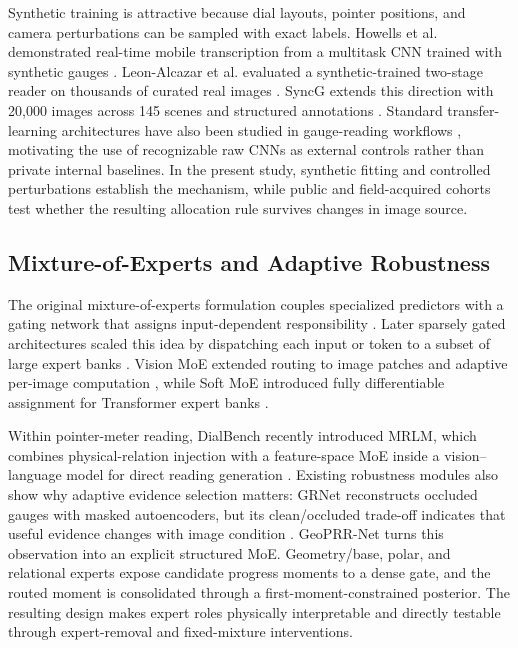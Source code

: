 \documentclass[electronics,article,submit,oneauthor]{Definitions/mdpi}
\newcommand{\modelname}{GeoPRR-Net\xspace}
\begin{document}
Synthetic training is attractive because dial layouts, pointer positions, and camera perturbations can be sampled with exact labels. Howells et al. demonstrated real-time mobile transcription from a multitask CNN trained with synthetic gauges \cite{howells2021analogue}. Leon-Alcazar et al. evaluated a synthetic-trained two-stage reader on thousands of curated real images \cite{leonalcazar2024synthetic}. SyncG extends this direction with 20,000 images across 145 scenes and structured annotations \cite{deng2026syncg}. Standard transfer-learning architectures have also been studied in gauge-reading workflows \cite{ninama2024transfer}, motivating the use of recognizable raw CNNs as external controls rather than private internal baselines. In the present study, synthetic fitting and controlled perturbations establish the mechanism, while public and field-acquired cohorts test whether the resulting allocation rule survives changes in image source.

\subsection{Mixture-of-Experts and Adaptive Robustness}

The original mixture-of-experts formulation couples specialized predictors with a gating network that assigns input-dependent responsibility \cite{jacobs1991adaptive}. Later sparsely gated architectures scaled this idea by dispatching each input or token to a subset of large expert banks \cite{shazeer2017sparsely}. Vision MoE extended routing to image patches and adaptive per-image computation \cite{riquelme2021vmoe}, while Soft MoE introduced fully differentiable assignment for Transformer expert banks \cite{puigcerver2024softmoe}.

Within pointer-meter reading, DialBench recently introduced MRLM, which combines physical-relation injection with a feature-space MoE inside a vision--language model for direct reading generation \cite{wang2025dialbench}. Existing robustness modules also show why adaptive evidence selection matters: GRNet reconstructs occluded gauges with masked autoencoders, but its clean/occluded trade-off indicates that useful evidence changes with image condition \cite{ninama2026grnet}. \modelname turns this observation into an explicit structured MoE. Geometry/base, polar, and relational experts expose candidate progress moments to a dense gate, and the routed moment is consolidated through a first-moment-constrained posterior. The resulting design makes expert roles physically interpretable and directly testable through expert-removal and fixed-mixture interventions.
\end{document}
